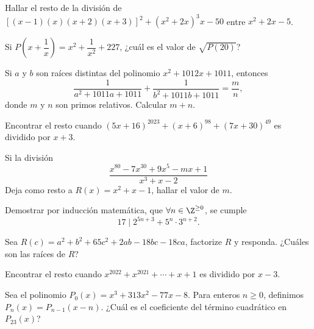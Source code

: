 \begin{section-problem}
    Hallar el resto de la división de $\left[(x - 1)(x)(x + 2)(x + 3)\right]^2 + (x^2 + 2x)^3 x - 50$ entre $x^2 + 2x - 5$.
\end{section-problem}

\begin{section-problem}
    Si $P\left(x + \dfrac{1}{x}\right) = x^2 + \dfrac{1}{x^2} + 227$, ¿cuál es el valor de $\sqrt {P(20)}$?
\end{section-problem}

\begin{section-problem}
    Si $a$ y $b$ son raíces distintas del polinomio $x^2 + 1012x + 1011$, entonces
    \[\frac{1}{a^2 + 1011a + 1011} + \frac{1}{b^2 + 1011b + 1011} = \frac{m}{n},\]
    donde $m$ y $n$ son primos relativos.
    Calcular $m + n$.
\end{section-problem}

\begin{section-problem}
    Encontrar el resto cuando $(5x + 16)^{2023} + (x + 6)^{98} + (7x + 30)^{49}$ es dividido por $x + 3$.
\end{section-problem}

\begin{section-problem}
    Si la división
    \[\frac{x^{80} - 7 x^{30} + 9x^5 - mx + 1}{x^3 + x - 2}\]
    Deja como resto a $R(x) = x^2 + x - 1$, hallar el valor de $m$.
\end{section-problem}

\begin{section-problem}
    Demostrar por inducción matemática, que $\forall n \in \Z^{\geq 0}$, se cumple
    \[17 \mid 2^{5n + 3} + 5^n \cdot 3^{n + 2}.\]
\end{section-problem}

\begin{section-problem}
    Sea $R(c) = a^2 + b^2 + 65c^2 + 2ab - 18bc - 18ca$, factorize $R$ y responda.
    ¿Cuáles son las raíces de $R$?
\end{section-problem}

\begin{section-problem}
    Encontrar el resto cuando $x^{2022} + x^{2021} + \cdots + x + 1$ es dividido por $x - 3$.
\end{section-problem}

\begin{section-problem}
    Sea el polinomio $P_0(x) = x^3 + 313x^2 - 77x - 8$.
    Para enteros $n \geq 0$, definimos $P_n(x) = P_{n - 1}(x - n)$.
    ¿Cuál es el coeficiente del término cuadrático en $P_{23}(x)$?
\end{section-problem}

